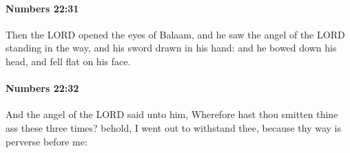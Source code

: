 		\paragraph{Numbers 22:31} %
			\label{NUMBERS-22-31}

			Then the LORD opened the eyes of Balaam, and he saw the angel of the LORD standing in the way, and his sword drawn in his hand: and he bowed down his head, and fell flat on his face.


		\paragraph{Numbers 22:32} %
			\label{NUMBERS-22-32}

			And the angel of the LORD said unto him, Wherefore hast thou smitten thine ass these three times? behold, I went out to withstand thee, because thy way is perverse before me:


